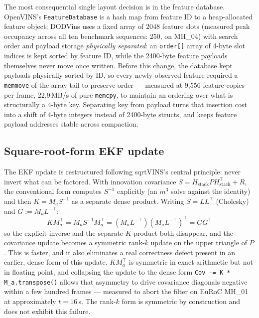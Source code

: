 \documentclass[10pt,conference,letterpaper]{IEEEtran}
\begin{document}
The most consequential single layout decision is in the feature database.
OpenVINS's \texttt{FeatureDatabase} is a hash map from feature ID to a
heap-allocated feature object; DODVins uses a fixed array of
2048 feature slots (measured peak occupancy across all ten benchmark
sequences: 250, on MH\_04) with search order and payload storage
\emph{physically separated}: an \texttt{order[]} array of 4-byte slot indices
is kept sorted by feature ID, while the 2400-byte feature payloads
themselves never move once written. Before this change, the database kept
payloads physically sorted by ID, so every newly observed feature required a
\texttt{memmove} of the array tail to preserve order --- measured at 9{,}556
feature copies per frame, 22.9\,MB/s of pure \texttt{memcpy}, to maintain an
ordering over what is structurally a 4-byte key. Separating key from payload
turns that insertion cost into a shift of 4-byte integers instead of
2400-byte structs, and keeps feature payload addresses stable across
compaction.

\subsection{Square-root-form EKF update}
\label{sec:sqrtform}

The EKF update is restructured following sqrtVINS's \cite{peng2025sqrtvins}
central principle: never invert what can be factored. With innovation
covariance $S = H_{\text{stack}} P H_{\text{stack}}^\top + R$, the
conventional form computes $S^{-1}$ explicitly (an $m^3$ solve against the
identity) and then $K = M_a S^{-1}$ as a separate dense product. Writing
$S = LL^\top$ (Cholesky) and $G := M_a L^{-\top}$:
\begin{equation}
K M_a^\top = M_a S^{-1} M_a^\top = (M_a L^{-\top})(M_a L^{-\top})^\top = GG^\top
\end{equation}
so the explicit inverse and the separate $K$ product both disappear, and the
covariance update becomes a symmetric rank-$k$ update on the upper triangle
of $P$. This is faster, and it also eliminates a real correctness
defect present in an earlier, dense form of this update. $K M_a^\top$ is
symmetric in exact arithmetic but not in floating point, and collapsing the
update to the dense form \texttt{Cov -= K * M\_a.transpose()} allows that
asymmetry to drive covariance diagonals negative within a few hundred
frames --- measured to abort the filter on EuRoC MH\_01 at approximately
$t{=}16$\,s. The rank-$k$ form is symmetric by construction and does not
exhibit this failure.
\end{document}
